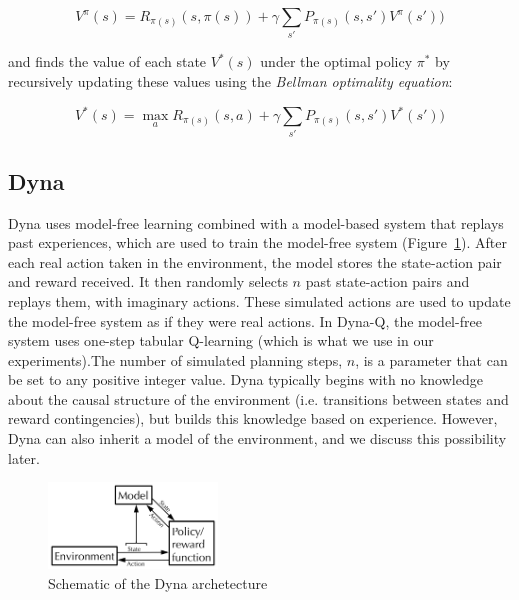 \documentclass[letterpaper]{article}
\begin{document}
\begin{equation}
V^{\pi}(s) = R_{\pi(s)}(s,\pi(s)) + \gamma \sum\limits_{s'} P_{\pi(s)}(s,s')V^{\pi}(s'))
\end{equation}

\noindent
and finds the value of each state $V^{*}(s)$ under the optimal policy $\pi^*$ by recursively updating these values using the \textit{Bellman optimality equation}:

\begin{equation}
V^{*}(s) = \max_a R_{\pi(s)}(s,a) + \gamma \sum\limits_{s'} P_{\pi(s)}(s,s')V^{*}(s'))
\end{equation}

\subsection{Dyna}

Dyna uses model-free learning combined with a model-based system that replays past experiences, which are used to train the model-free system (Figure~\ref{fig:dyna_schematic}). After each real action taken in the environment, the model stores the state-action pair and reward received. It then randomly selects $n$ past state-action pairs and replays them, with imaginary actions. These simulated actions are used to update the model-free system as if they were real actions. In Dyna-Q, the model-free system uses one-step tabular Q-learning (which is what we use in our experiments).The number of simulated planning steps, $n$, is a parameter that can be set to any positive integer value. Dyna typically begins with no knowledge about the causal structure of the environment (i.e. transitions between states and reward contingencies), but builds this knowledge based on experience. However, Dyna can also inherit a model of the environment, and we discuss this possibility later.

\begin{figure}[ht]
\centering
\includegraphics[width=0.4\textwidth]{dyna_schematic}
\caption{Schematic of the Dyna archetecture}
\label{fig:dyna_schematic}
\end{figure}
\end{document}
